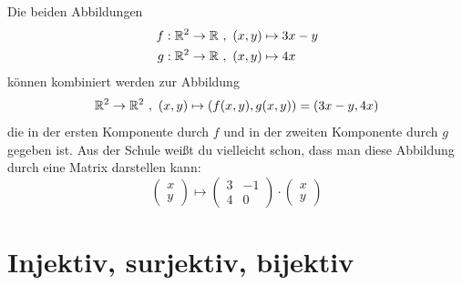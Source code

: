 \begin{bsp}
 Die beiden Abbildungen
 \begin{align*}
  f : {\mathbb R}^2 \to {\mathbb R} \ &,\ (x,y) \mapsto 3x-y \\
  g : {\mathbb R}^2 \to {\mathbb R} \ &,\ (x,y) \mapsto 4x
 \end{align*}
können kombiniert werden zur Abbildung
\[ {\mathbb R}^2 \to {\mathbb R}^2 \ ,\ (x,y) \mapsto (f(x,y),g(x,y)) = (3x-y,4x) \]
die in der ersten Komponente durch $f$ und in der zweiten Komponente durch $g$ gegeben ist. Aus der Schule weißt du vielleicht schon, dass man diese Abbildung durch eine Matrix darstellen kann:
\[ \begin{pmatrix}
    x \\ y
   \end{pmatrix} \mapsto \begin{pmatrix}
   3 & -1 \\
   4 & 0
   \end{pmatrix} \cdot \begin{pmatrix}x \\ y   \end{pmatrix}\]
\end{bsp}








\section{Injektiv, surjektiv, bijektiv}

